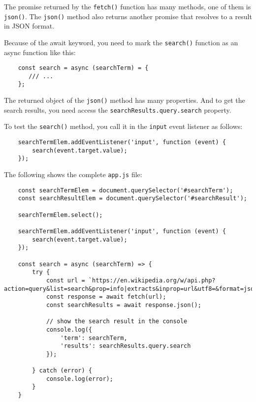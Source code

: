 \documentclass[11pt]{article}
\begin{document}
\noindent
The promise returned by the \verb|fetch()| function has many methods,
one of them is \verb|json()|. The \verb|json()| method also returns another promise
that resolves to a result in JSON format.
\newline

\noindent
Because of the await keyword, you need to mark the \verb|search()| function
as an async function like this:

\begin{lstlisting}
    const search = async (searchTerm) = {
       /// ...
    };
\end{lstlisting}

\noindent
The returned object of the \verb|json()| method has many properties.
And to get the search results, you need access
the \verb|searchResults.query.search| property.
\newline

\noindent
To test the \verb|search()| method, you call it in the \verb|input| event
listener as follows:

\begin{lstlisting}
    searchTermElem.addEventListener('input', function (event) {
        search(event.target.value);
    });
\end{lstlisting}

\noindent
The following shows the complete \verb|app.js| file:

\begin{lstlisting}
    const searchTermElem = document.querySelector('#searchTerm');
    const searchResultElem = document.querySelector('#searchResult');

    searchTermElem.select();

    searchTermElem.addEventListener('input', function (event) {
        search(event.target.value);
    });

    const search = async (searchTerm) => {
        try {
            const url = `https://en.wikipedia.org/w/api.php?action=query&list=search&prop=info|extracts&inprop=url&utf8=&format=json&origin=*&srlimit=10&srsearch=${searchTerm}`;
            const response = await fetch(url);
            const searchResults = await response.json();

            // show the search result in the console
            console.log({
                'term': searchTerm,
                'results': searchResults.query.search
            });

        } catch (error) {
            console.log(error);
        }
    }
\end{lstlisting}
\end{document}
